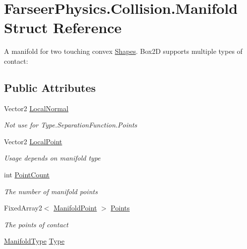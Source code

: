 \hypertarget{struct_farseer_physics_1_1_collision_1_1_manifold}{\section{Farseer\+Physics.\+Collision.\+Manifold Struct Reference}
\label{struct_farseer_physics_1_1_collision_1_1_manifold}
}


A manifold for two touching convex \hyperlink{namespace_farseer_physics_1_1_collision_1_1_shapes}{Shapes}. Box2\+D supports multiple types of contact\+:  


\subsection*{Public Attributes}
\begin{DoxyCompactItemize}
\item 
Vector2 \hyperlink{struct_farseer_physics_1_1_collision_1_1_manifold_a49ad5b0ae45736b509d5445f8e04e823}{Local\+Normal}
\begin{DoxyCompactList}\small\item\em Not use for Type.\+Separation\+Function.\+Points \end{DoxyCompactList}\item 
Vector2 \hyperlink{struct_farseer_physics_1_1_collision_1_1_manifold_a6502701f36cda294be0ffe4f081cb6ed}{Local\+Point}
\begin{DoxyCompactList}\small\item\em Usage depends on manifold type \end{DoxyCompactList}\item 
int \hyperlink{struct_farseer_physics_1_1_collision_1_1_manifold_ac56b36d7ff7370ee663f27d62537ef3d}{Point\+Count}
\begin{DoxyCompactList}\small\item\em The number of manifold points \end{DoxyCompactList}\item 
Fixed\+Array2$<$ \hyperlink{struct_farseer_physics_1_1_collision_1_1_manifold_point}{Manifold\+Point} $>$ \hyperlink{struct_farseer_physics_1_1_collision_1_1_manifold_a37a6a5311e01b146c829ce90c3cfb3d1}{Points}
\begin{DoxyCompactList}\small\item\em The points of contact \end{DoxyCompactList}\item 
\hyperlink{namespace_farseer_physics_1_1_collision_a7020490145ac65404675bdce1ebeafae}{Manifold\+Type} \hyperlink{struct_farseer_physics_1_1_collision_1_1_manifold_a4bd0e0439598b8525f6cbdc69e296736}{Type}
\end{DoxyCompactItemize}


